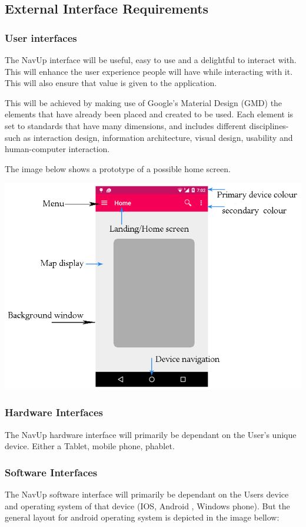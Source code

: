 \documentclass[11pt]{article}
\begin{document}
		\subsection{External Interface Requirements}
      	\subsubsection{User interfaces}
				
				The NavUp interface will be useful, easy to use and a delightful to interact with. This will enhance the user experience people will have while interacting with it. This will also ensure that value is given to the application.
				
				This will be achieved by making use of Google's Material Design (GMD) the elements that have already been placed and created to be used. Each element is set to standards that have many dimensions, and includes different disciplines-such as interaction design, information architecture, visual design, usability and human-computer interaction.
				
				The image below shows a prototype of a possible home screen.
				
				\includegraphics[width=0.5\linewidth]{Images/userInterface.jpg}\\[0.5cm]
				
	\subsubsection{Hardware Interfaces}
				The NavUp hardware interface will primarily be dependant on the User’s unique device. Either a Tablet, mobile phone, phablet. 	
					
	\subsubsection{Software Interfaces}
				The NavUp software  interface will primarily be dependant on the Users device and operating system of that device (IOS, Android , Windows phone). But the general layout for android operating system is depicted in the image bellow:
				
\end{document}
